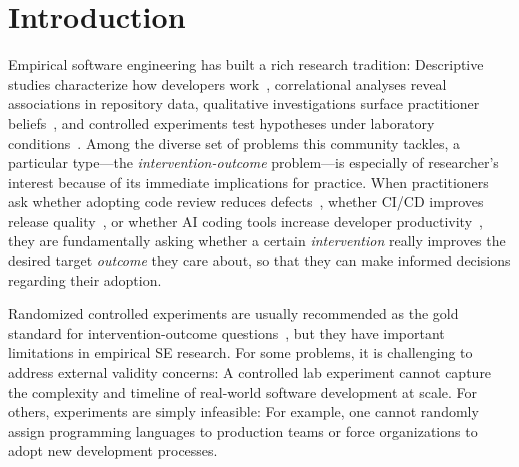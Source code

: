 \section{Introduction}

Empirical software engineering has built a rich research tradition: Descriptive studies characterize how developers work~\cite{DBLP:journals/queue/ForsgrenSMZHB21}, correlational analyses reveal associations in repository data, qualitative investigations surface practitioner beliefs~\cite{DBLP:conf/icse/Devanbu0B16}, and controlled experiments test hypotheses under laboratory conditions~\cite{DBLP:books/sp/WohlinRHORW24}.
Among the diverse set of problems this community tackles, a particular type---the \emph{intervention-outcome} problem---is especially of researcher's interest because of its  immediate implications for practice.
When practitioners ask whether adopting code review reduces defects~\cite{DBLP:journals/ese/McIntoshKAH16}, whether CI/CD improves release quality~\cite{DBLP:conf/kbse/HiltonTHMD16}, or whether AI coding tools increase developer productivity~\cite{DBLP:conf/msr/HeMAKV26}, they are fundamentally asking whether a certain \emph{intervention} really improves the desired target \emph{outcome} they care about, so that they can make informed decisions regarding their adoption.

Randomized controlled experiments are usually recommended as the gold standard for intervention-outcome questions~\cite{shadish2002experimental}, but they have important limitations in empirical SE research.
For some problems, it is challenging to address external validity concerns: A controlled lab experiment cannot capture the complexity and timeline of real-world software development at scale.
For others, experiments are simply infeasible: For example, one cannot randomly assign programming languages to production teams or force organizations to adopt new development processes.

